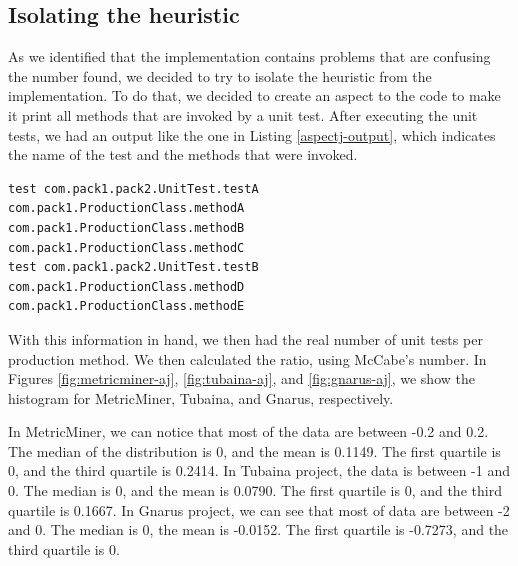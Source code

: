 \documentclass{sig-alternate}
\begin{document}
\subsection{Isolating the heuristic}

As we identified that the implementation contains problems that are confusing the number found,
we decided to try to isolate the heuristic from the implementation. To do that, we decided to
create an aspect to the code to make it print all methods that are invoked by a unit test. After executing
the unit tests, we had an output
like the one in Listing \ref{aspectj-output}, which indicates the name of the test and the methods that were invoked.

\begin{lstlisting}
test com.pack1.pack2.UnitTest.testA
com.pack1.ProductionClass.methodA
com.pack1.ProductionClass.methodB
com.pack1.ProductionClass.methodC
test com.pack1.pack2.UnitTest.testB
com.pack1.ProductionClass.methodD
com.pack1.ProductionClass.methodE
\end{lstlisting}

With this information in hand, we then had the real number of unit tests per production method. We then
calculated the ratio, using McCabe's number. In Figures \ref{fig:metricminer-aj}, \ref{fig:tubaina-aj}, and
\ref{fig:gnarus-aj}, we show the histogram for MetricMiner, Tubaina, and Gnarus, respectively. 

In MetricMiner, we can notice that most of the data are between -0.2 and 0.2. 
The median of the distribution is 0, and the mean is 0.1149. The first quartile is 0, and the
third quartile is 0.2414.
In Tubaina project, the data is between
-1 and 0. The median is 0, and the mean is 0.0790. The first quartile is
0, and the third quartile is 0.1667. 
In Gnarus project, we can see that most of data
are between -2 and 0. The median is 0, the mean is -0.0152. The first quartile
is -0.7273, and the third quartile is 0.
\end{document}

